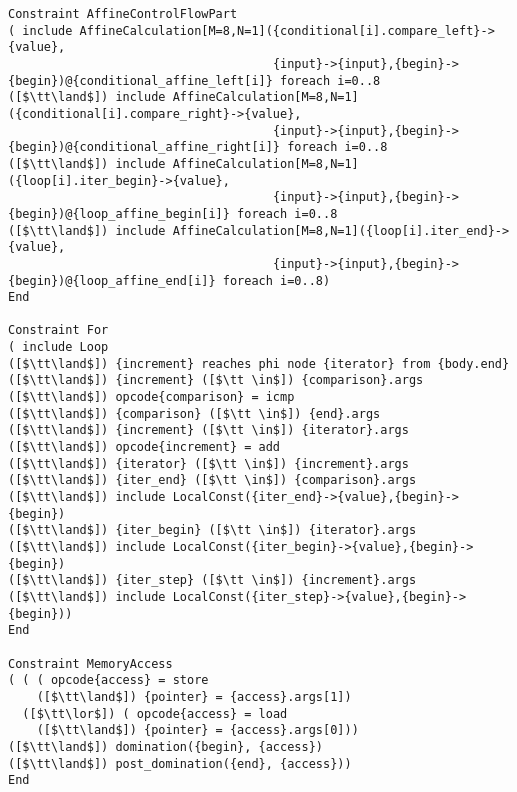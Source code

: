\begin{lstlisting}[language=CAnDL]
Constraint AffineControlFlowPart
( include AffineCalculation[M=8,N=1]({conditional[i].compare_left}->{value},
                                     {input}->{input},{begin}->{begin})@{conditional_affine_left[i]} foreach i=0..8
([$\tt\land$]) include AffineCalculation[M=8,N=1]({conditional[i].compare_right}->{value},
                                     {input}->{input},{begin}->{begin})@{conditional_affine_right[i]} foreach i=0..8
([$\tt\land$]) include AffineCalculation[M=8,N=1]({loop[i].iter_begin}->{value},
                                     {input}->{input},{begin}->{begin})@{loop_affine_begin[i]} foreach i=0..8
([$\tt\land$]) include AffineCalculation[M=8,N=1]({loop[i].iter_end}->{value},
                                     {input}->{input},{begin}->{begin})@{loop_affine_end[i]} foreach i=0..8)
End

Constraint For
( include Loop
([$\tt\land$]) {increment} reaches phi node {iterator} from {body.end}
([$\tt\land$]) {increment} ([$\tt \in$]) {comparison}.args
([$\tt\land$]) opcode{comparison} = icmp
([$\tt\land$]) {comparison} ([$\tt \in$]) {end}.args
([$\tt\land$]) {increment} ([$\tt \in$]) {iterator}.args
([$\tt\land$]) opcode{increment} = add
([$\tt\land$]) {iterator} ([$\tt \in$]) {increment}.args
([$\tt\land$]) {iter_end} ([$\tt \in$]) {comparison}.args
([$\tt\land$]) include LocalConst({iter_end}->{value},{begin}->{begin})
([$\tt\land$]) {iter_begin} ([$\tt \in$]) {iterator}.args
([$\tt\land$]) include LocalConst({iter_begin}->{value},{begin}->{begin})
([$\tt\land$]) {iter_step} ([$\tt \in$]) {increment}.args
([$\tt\land$]) include LocalConst({iter_step}->{value},{begin}->{begin}))
End

Constraint MemoryAccess
( ( ( opcode{access} = store
    ([$\tt\land$]) {pointer} = {access}.args[1])
  ([$\tt\lor$]) ( opcode{access} = load
    ([$\tt\land$]) {pointer} = {access}.args[0]))
([$\tt\land$]) domination({begin}, {access})
([$\tt\land$]) post_domination({end}, {access}))
End


\end{lstlisting}
